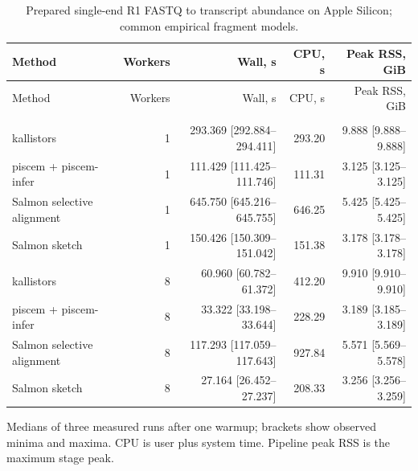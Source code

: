 \begingroup
\small
\setlength{\tabcolsep}{4pt}
\begin{longtable}{@{}lrrrr@{}}
\caption{Prepared single-end R1 FASTQ to transcript abundance on Apple Silicon; common empirical fragment models.}\label{tab:paper-bulk-single}\\
\toprule
Method & Workers & Wall, s & CPU, s & Peak RSS, GiB \\
\midrule
\endfirsthead
\toprule
Method & Workers & Wall, s & CPU, s & Peak RSS, GiB \\
\midrule
\endhead
\bottomrule
\endfoot
\addlinespace
\multicolumn{5}{@{}l}{\textit{SRR10919051-se}} \\
kallistors & 1 & 293.369 [292.884--294.411] & 293.20 & 9.888 [9.888--9.888] \\
piscem + piscem-infer & 1 & 111.429 [111.425--111.746] & 111.31 & 3.125 [3.125--3.125] \\
Salmon selective alignment & 1 & 645.750 [645.216--645.755] & 646.25 & 5.425 [5.425--5.425] \\
Salmon sketch & 1 & 150.426 [150.309--151.042] & 151.38 & 3.178 [3.178--3.178] \\
kallistors & 8 & 60.960 [60.782--61.372] & 412.20 & 9.910 [9.910--9.910] \\
piscem + piscem-infer & 8 & 33.322 [33.198--33.644] & 228.29 & 3.189 [3.185--3.189] \\
Salmon selective alignment & 8 & 117.293 [117.059--117.643] & 927.84 & 5.571 [5.569--5.578] \\
Salmon sketch & 8 & 27.164 [26.452--27.237] & 208.33 & 3.256 [3.256--3.259] \\
\end{longtable}
\noindent\footnotesize Medians of three measured runs after one warmup; brackets show observed minima and maxima. CPU is user plus system time. Pipeline peak RSS is the maximum stage peak.
\endgroup
